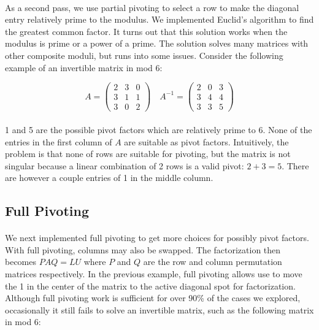 \documentclass[11pt]{article}
\begin{document}
\paragraph{} As a second pass, we use partial pivoting to select a row to make the diagonal entry relatively prime to the modulus.  We implemented Euclid’s algorithm to find the greatest common factor.  It turns out that this solution works when the modulus is prime or a power of a prime.  The solution solves many matrices with other composite moduli, but runs into some issues.  Consider the following example of an invertible matrix in mod 6:

\[
A =
\begin{pmatrix}
2 & 3 & 0 \\
3 & 1 & 1 \\
3 & 0 & 2
\end{pmatrix}
\quad
A^{-1} =
\begin{pmatrix}
2 & 0 & 3 \\
3 & 4 & 4 \\
3 & 3 & 5
\end{pmatrix}
\]

\paragraph{} 1 and 5 are the possible pivot factors which are relatively prime to 6.  None of the entries in the first column of $A$ are suitable as pivot factors.  Intuitively, the problem is that none of rows are suitable for pivoting, but the matrix is not singular because a linear combination of 2 rows is a valid pivot: $2 + 3 = 5$.  There are however a couple entries of 1 in the middle column.

\subsection*{Full Pivoting}

\paragraph{} We next implemented full pivoting to get more choices for possibly pivot factors.  With full pivoting, columns may also be swapped.  The factorization then becomes $PAQ = LU$ where $P$ and $Q$ are the row and column permutation matrices respectively.  In the previous example, full pivoting allows use to move the 1 in the center of the matrix to the active diagonal spot for factorization.  Although full pivoting work is sufficient for over 90\% of the cases we explored, occasionally it still fails to solve an invertible matrix, such as the following matrix in mod 6:
\end{document}
